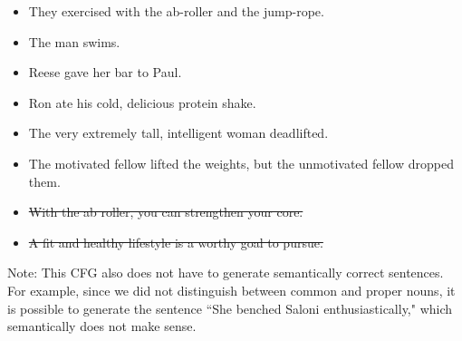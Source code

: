 \documentclass{article}
\begin{document}
\begin{tcolorbox}[enhanced,interior style={top color=Dandelion!20,bottom color=Dandelion!30}]
\begin{itemize}
\begin{itemize}
                \item They exercised with the ab-roller and the jump-rope.
                \item The man swims.
                \item Reese gave her bar to Paul.
                \item Ron ate his cold, delicious protein shake.
                \item The very extremely tall, intelligent woman deadlifted.
                \item The motivated fellow lifted the weights, but the unmotivated fellow dropped them.
                \item \st{With the ab roller, you can strengthen your core.}
                \item \st{A fit and healthy lifestyle is a worthy goal to pursue.}
            \end{itemize}

            Note: This CFG also does not have to generate semantically correct sentences. For example, since we did not distinguish between common and proper nouns, it is possible to generate the sentence ``She benched Saloni enthusiastically," which semantically does not make sense.
        \end{itemize}
\end{tcolorbox}




\end{document}
